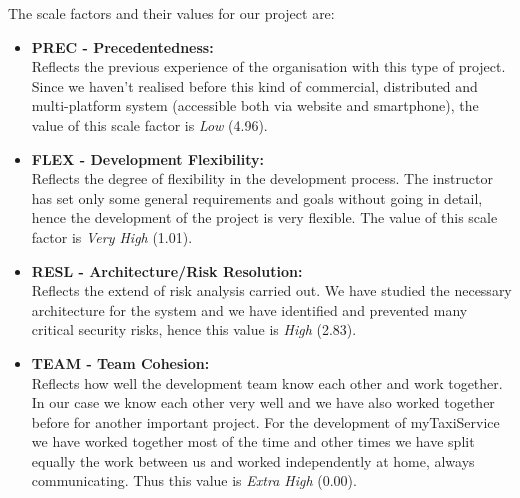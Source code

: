\documentclass[\mainpath/main]{subfiles}
\begin{document}
The scale factors and their values for our project are:

\begin{itemize}
	\item \textbf{PREC - Precedentedness:}\\
	Reflects the previous experience of the organisation with this type of project. Since we haven't realised before this kind of commercial, distributed and multi-platform system (accessible both via website and smartphone), the value of this scale factor is \textit{Low} (4.96).
	
	\item  \textbf{FLEX - Development Flexibility:}\\
	Reflects the degree of flexibility in the development process. The instructor has set only some general requirements and goals without going in detail, hence the development of the project is very flexible. The value of this scale factor is \textit{Very High} (1.01).
	
	\item \textbf{RESL - Architecture/Risk Resolution:}\\
	Reflects the extend of risk analysis carried out. We have studied the necessary architecture for the system and we have identified and prevented many critical security risks, hence this value is \textit{High} (2.83).
	
	\item \textbf{TEAM - Team Cohesion:}\\
	Reflects how well the development team know each other and work together. In our case we know each other very well and we have also worked together before for another important project. For the development of myTaxiService we have worked together most of the time and other times we have split equally the work between us and worked independently at home, always communicating. Thus this value is \textit{Extra High} (0.00).
	

\end{itemize}
\end{document}
